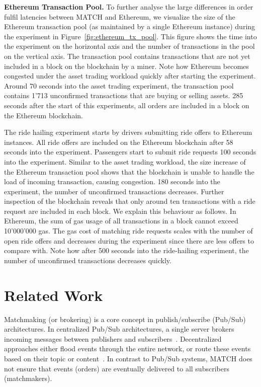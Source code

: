\textbf{Ethereum Transaction Pool.}
To further analyse the large differences in order fulfil latencies between MATCH and Ethereum, we visualize the size of the Ethereum transaction pool (as maintained by a single Ethereum instance) during the experiment in Figure~\ref{fig:ethereum_tx_pool}.
This figure shows the time into the experiment on the horizontal axis and the number of transactions in the pool on the vertical axis.
The transaction pool contains transactions that are not yet included in a block on the blockchain by a miner.
Note how Ethereum becomes congested under the asset trading workload quickly after starting the experiment.
Around 70 seconds into the asset trading experiment, the transaction pool contains 1'713 unconfirmed transactions that are buying or selling assets.
285 seconds after the start of this experiments, all orders are included in a block on the Ethereum blockchain.

The ride hailing experiment starts by drivers submitting ride offers to Ethereum instances.
All ride offers are included on the Ethereum blockchain after 58 seconds into the experiment.
Passengers start to submit ride requests 100 seconds into the experiment.
Similar to the asset trading workload, the size increase of the Ethereum transaction pool shows that the blockchain is unable to handle the load of incoming transaction, causing congestion.
180 seconds into the experiment, the number of unconfirmed transactions decreases.
Further inspection of the blockchain reveals that only around ten transactions with a ride request are included in each block.
We explain this behaviour as follows.
In Ethereum, the sum of gas usage of all transactions in a block cannot exceed 10'000'000 gas.
The gas cost of matching ride requests scales with the number of open ride offers and decreases during the experiment since there are less offers to compare with.
Note how after 500 seconds into the ride-hailing experiment, the number of unconfirmed transactions decreases quickly.


\section{Related Work}
Matchmaking (or brokering) is a core concept in publish/subscribe (Pub/Sub) architectures.
In centralized Pub/Sub architectures, a single server brokers incoming messages between publishers and subscribers~\cite{Carzaniga2001DesignAE}.
Decentralized approaches either flood events through the entire network, or route these events based on their topic or content~\cite{banavar1999efficient,carzaniga2004routing}.
In contrast to Pub/Sub systems, MATCH does not ensure that events (orders) are eventually delivered to all subscribers (matchmakers).

